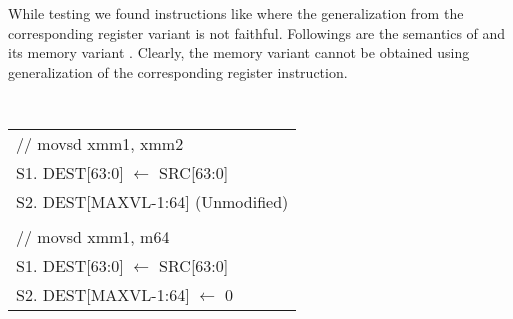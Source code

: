    While testing we found instructions like 
   where the generalization from the corresponding register variant is not
   faithful. Followings are the semantics of  and its
   memory variant  . Clearly, the memory variant cannot
   be obtained using generalization of the  corresponding register instruction.   
   
   {\small \tt 
       \centering
       \begin{tabular}[b]{l}
           // movsd xmm1, xmm2 \\
           S1. DEST[63:0] $\leftarrow$ SRC[63:0] \\ 
           S2. DEST[MAXVL-1:64] (Unmodified) \\
           \\
           // movsd xmm1, m64 \\
           S1. DEST[63:0] $\leftarrow$ SRC[63:0] \\
           S2. DEST[MAXVL-1:64] $\leftarrow$ 0 \\
       \end{tabular}
   }





